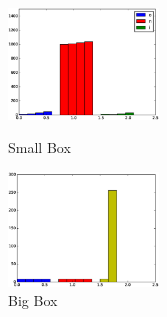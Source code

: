 






\begin{figure}   
  \begin{minipage}[t]{0.5\linewidth}  
    \centering   
    \includegraphics[width=4.0cm]{images/onions-for-string.eps}   
    \caption{Small Box}   
    \label{fig:side:a}   
  \end{minipage}%
  \begin{minipage}[t]{0.5\linewidth}   
    \centering   
    \includegraphics[width=4.0cm]{images/onion-for-integer.eps}   
    \caption{Big Box}   
    \label{fig:side:b}   
  \end{minipage}   
\end{figure}








